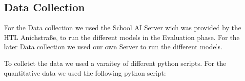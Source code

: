 \cite{Ollama-models-overview}


\subsection{Data Collection}

For the Data collection we used the School AI Server wich was provided by the HTL Anichstraße, to run the different models in the Evaluation phase.
For the later Data collection we used our own Server to run the different models.


To colletct the data we used a varaitey of different python scripts. For the quantitative data we used the following python script:

